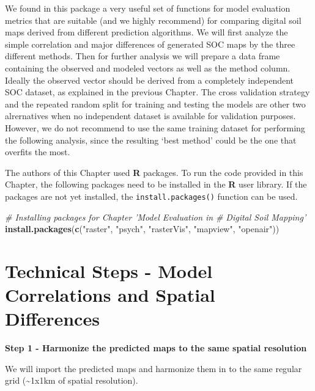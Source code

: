 \documentclass[10pt,b5paper,]{book}
\newenvironment{Shaded}{\begin{snugshade}}{\end{snugshade}}
\newcommand{\CommentTok}[1]{\textcolor[rgb]{0.56,0.35,0.01}{\textit{#1}}}
\newcommand{\KeywordTok}[1]{\textcolor[rgb]{0.13,0.29,0.53}{\textbf{#1}}}
\newcommand{\NormalTok}[1]{#1}
\newcommand{\StringTok}[1]{\textcolor[rgb]{0.31,0.60,0.02}{#1}}
\theoremstyle{definition}
\theoremstyle{definition}
\theoremstyle{definition}
\theoremstyle{remark}
\begin{document}
We found in this package a very useful set of functions for model
evaluation metrics that are suitable (and we highly recommend) for
comparing digital soil maps derived from different prediction
algorithms. We will first analyze the simple correlation and major
differences of generated SOC maps by the three different methods. Then
for further analysis we will prepare a data frame containing the
observed and modeled vectors as well as the method column. Ideally the
observed vector should be derived from a completely independent SOC
dataset, as explained in the previous Chapter. The cross validation
strategy and the repeated random split for training and testing the
models are other two alrernatives when no independent dataset is
available for validation purposes. However, we do not recommend to use
the same training dataset for performing the following analysis, since
the resulting `best method' could be the one that overfits the most.

The authors of this Chapter used \textbf{R} packages. To run the code
provided in this Chapter, the following packages need to be installed in
the \textbf{R} user library. If the packages are not yet installed, the
\texttt{install.packages()} function can be used.

\begin{Shaded}
\begin{Highlighting}[]
\CommentTok{# Installing packages for Chapter 'Model Evaluation in}
\CommentTok{# Digital Soil Mapping'}
\KeywordTok{install.packages}\NormalTok{(}\KeywordTok{c}\NormalTok{(}\StringTok{"raster"}\NormalTok{, }\StringTok{"psych"}\NormalTok{, }\StringTok{"rasterVis"}\NormalTok{,}
                   \StringTok{"mapview"}\NormalTok{, }\StringTok{"openair"}\NormalTok{))}
\end{Highlighting}
\end{Shaded}

\hypertarget{technical-steps---model-correlations-and-spatial-differences}{%
\section{Technical Steps - Model Correlations and Spatial
Differences}\label{technical-steps---model-correlations-and-spatial-differences}}

\textbf{Step 1 - Harmonize the predicted maps to the same spatial
resolution}

We will import the predicted maps and harmonize them in to the same
regular grid (\textasciitilde{}1x1km of spatial resolution).
\end{document}
